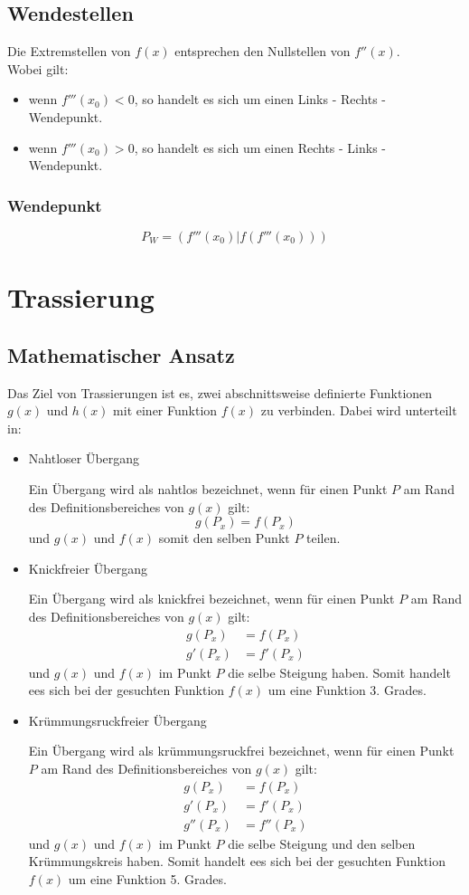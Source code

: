 \documentclass[a4paper,12pt]{article}
\begin{document}
\subsection{Wendestellen}
Die Extremstellen von $f(x)$ entsprechen den Nullstellen von $f''(x)$.\\
Wobei gilt:
\begin{itemize}
\item wenn $f'''(x_0) < 0$, so handelt es sich um einen Links - Rechts - Wendepunkt.
\item wenn $f'''(x_0) > 0$, so handelt es sich um einen Rechts - Links - Wendepunkt.
\end{itemize}
\subsubsection{Wendepunkt}
$$P_{W} = (f'''(x_0) | f(f'''(x_0)))$$
\pagebreak
\section{Trassierung}
\subsection{Mathematischer Ansatz}
Das Ziel von Trassierungen ist es, zwei abschnittsweise definierte Funktionen $g(x)$ und $h(x)$ mit einer Funktion $f(x)$ zu verbinden.
Dabei wird unterteilt in:
\begin{itemize}
\item Nahtloser Übergang
	\subitem \parbox[t]{\linewidth}
	{
		Ein Übergang wird als nahtlos bezeichnet, wenn für einen Punkt $P$ am Rand des Definitionsbereiches von $g(x)$ gilt:
		$$g(P_x) = f(P_x)$$
		und $g(x)$ und $f(x)$ somit den selben Punkt $P$ teilen.
	}
\item Knickfreier Übergang
	\subitem \parbox[t]{\linewidth}
	{
		Ein Übergang wird als knickfrei bezeichnet, wenn für einen Punkt $P$ am Rand des Definitionsbereiches von $g(x)$ gilt:
		\begin{equation}
		\begin{split}
		g(P_x) & = f(P_x)\\
		g'(P_x) &  = f'(P_x)
		\end{split}
		\end{equation}
		und $g(x)$ und $f(x)$ im Punkt $P$ die selbe Steigung haben. Somit handelt ees sich bei der gesuchten Funktion $f(x)$ um eine Funktion 3. Grades.
	}
\item Krümmungsruckfreier Übergang
	\subitem \parbox[t]{\linewidth}
	{
		Ein Übergang wird als krümmungsruckfrei bezeichnet, wenn für einen Punkt $P$ am Rand des Definitionsbereiches von $g(x)$ gilt:
		\begin{equation}
		\begin{split}
		g(P_x) & = f(P_x)\\
		g'(P_x) &  = f'(P_x)\\
		g''(P_x) & = f''(P_x)
		\end{split}
		\end{equation}
		und $g(x)$ und $f(x)$ im Punkt $P$ die selbe Steigung und den selben Krümmungskreis haben. Somit handelt ees sich bei der gesuchten Funktion $f(x)$ um eine Funktion 5. Grades.
	}
\end{itemize}
\pagebreak
\end{document}
